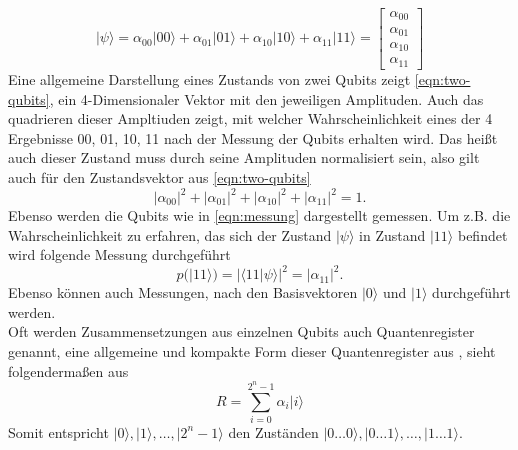 \begin{equation}\label{eqn:two-qubits}
|\psi \rangle = \alpha_{00} |00\rangle + \alpha_{01} |01\rangle + \alpha_{10} |10\rangle + \alpha_{11} |11\rangle = \begin{bmatrix} \alpha_{00} \\ \alpha_{01} \\ \alpha_{10} \\ \alpha_{11} \end{bmatrix}
\end{equation}
Eine allgemeine Darstellung eines Zustands von zwei Qubits zeigt \ref{eqn:two-qubits}, ein 4-Dimensionaler Vektor mit den jeweiligen Amplituden. Auch das quadrieren dieser Ampltiuden zeigt, mit welcher Wahrscheinlichkeit eines der 4 Ergebnisse 00, 01, 10, 11 nach der Messung der Qubits erhalten wird.
Das hei\ss t auch dieser Zustand muss durch seine Amplituden normalisiert sein, also gilt auch f\"ur den Zustandsvektor aus \ref{eqn:two-qubits}
\begin{equation}
|\alpha_{00}|^2+|\alpha_{01}|^2+|\alpha_{10}|^2+|\alpha_{11}|^2 = 1 .
\end{equation}
Ebenso werden die Qubits wie in \ref{eqn:messung} dargestellt gemessen. Um z.B. die Wahrscheinlichkeit zu erfahren, das sich der Zustand $|\psi \rangle$ in Zustand $|11\rangle$ befindet wird folgende Messung durchgef\"uhrt
\begin{equation}
p(|11\rangle) = |\langle 11| \psi  \rangle|^2 = |\alpha_{11}|^2.
\end{equation}
Ebenso k\"onnen auch Messungen, nach den Basisvektoren $|0 \rangle$ und $| 1\rangle$ durchgef\"uhrt werden.
\\
Oft werden Zusammensetzungen aus einzelnen Qubits auch Quantenregister genannt, eine allgemeine und kompakte Form dieser Quantenregister aus \cite{Homeister-2022}, sieht folgenderma\ss en aus
\begin{equation}
R = \sum\limits_{i=0}^{2^{n}-1} \alpha_i |i\rangle
\end{equation}
Somit entspricht $|0\rangle, |1\rangle, \dots, |2^{n}-1\rangle$ den Zust\"anden $|0\dots 0\rangle, |0\dots 1\rangle, \dots, |1\dots 1\rangle$.

